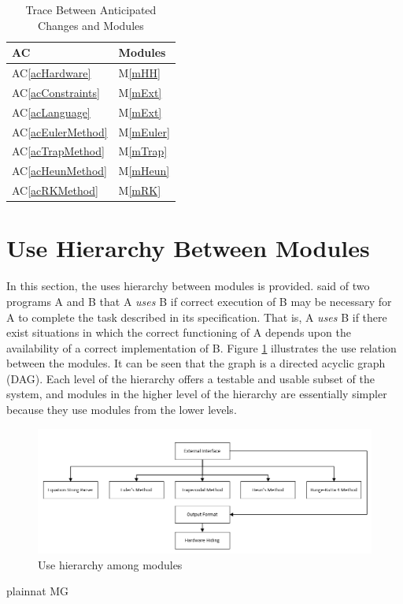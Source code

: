 \documentclass[12pt, titlepage]{article}
\newcommand{\acref}[1]{AC\ref{#1}}
\newcommand{\mref}[1]{M\ref{#1}}
\begin{document}
\begin{table}[H]
\centering
\begin{tabular}{p{} p{}}
\toprule
\textbf{AC} & \textbf{Modules}\\
\midrule
\acref{acHardware} & \mref{mHH}\\
\acref{acConstraints} & \mref{mExt}\\
\acref{acLanguage} & \mref{mExt}\\
\acref{acEulerMethod} & \mref{mEuler}\\
\acref{acTrapMethod} & \mref{mTrap}\\
\acref{acHeunMethod} & \mref{mHeun}\\
\acref{acRKMethod} & \mref{mRK}\\
\bottomrule
\end{tabular}
\caption{Trace Between Anticipated Changes and Modules}
\label{TblACT}
\end{table}

\section{Use Hierarchy Between Modules} \label{SecUse}

In this section, the uses hierarchy between modules is
provided. \citet{Parnas1978} said of two programs A and B that A {\em uses} B if
correct execution of B may be necessary for A to complete the task described in
its specification. That is, A {\em uses} B if there exist situations in which
the correct functioning of A depends upon the availability of a correct
implementation of B.  Figure \ref{FigUH} illustrates the use relation between
the modules. It can be seen that the graph is a directed acyclic graph
(DAG). Each level of the hierarchy offers a testable and usable subset of the
system, and modules in the higher level of the hierarchy are essentially simpler
because they use modules from the lower levels.

\begin{figure}[H]
\centering
\includegraphics[width=1.1\textwidth]{use.png}
\caption{Use hierarchy among modules}
\label{FigUH}
\end{figure}


 {plainnat}
 {MG}
\end{document}
